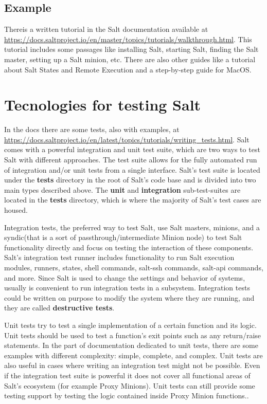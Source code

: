 \documentclass[12pt,a4paper,openright,twoside]{book}
\begin{document}
\subsection{Example}
Thereis a written tutorial in the Salt documentation available at \url{https://docs.saltproject.io/en/master/topics/tutorials/walkthrough.html}.
This tutorial includes some passages like installing Salt, starting Salt, finding the Salt master, setting up a Salt minion, etc.
There are also other guides like a tutorial about Salt States and Remote Execution and a step-by-step guide for MacOS.

\section{Tecnologies for testing Salt}
In the docs there are some tests, also with examples, at \url{
https://docs.saltproject.io/en/latest/topics/tutorials/writing\_tests.html}.
Salt comes with a powerful integration and unit test suite, which are two ways to test Salt with different approaches.
The test suite allows for the fully automated run of integration and/or unit tests from a single interface.
Salt's test suite is located under the \textbf{tests} directory in the root of Salt's code base and is divided into two main types described above.
The \textbf{unit} and \textbf{integration} sub-test-suites are located in the \textbf{tests} directory, which is where the majority of Salt's test cases are housed.\cite{saltDocTest}


Integration tests, the preferred way to test Salt, use Salt masters, minions, and a syndic(that is a sort of passthrough/intermediate Minion node) to test Salt functionality directly and focus on testing the interaction of these components.
Salt's integration test runner includes functionality to run Salt execution modules, runners, states, shell commands, salt-ssh commands, salt-api commands, and more.
Since Salt is used to change the settings and behavior of systems, usually is convenient to run integration tests in a subsystem.
Integration tests could be written on purpose to modify the system where they are running, and they are called \textbf{destructive tests}\cite{saltDocTest}.


Unit tests try to test a single implementation of a certain function and its logic. Unit tests should be used to test a function's exit points such as any return/raise statements.
In the part of documentation dedicated to unit tests, there are some examples with different complexity: simple, complete, and complex.
Unit tests are also useful in cases where writing an integration test might not be possible.
Even if the integration test suite is powerful it does not cover all functional areas of Salt's ecosystem (for example Proxy Minions).
Unit tests can still provide some testing support by testing the logic contained inside Proxy Minion functions.\cite{saltDocTest}.
\end{document}
